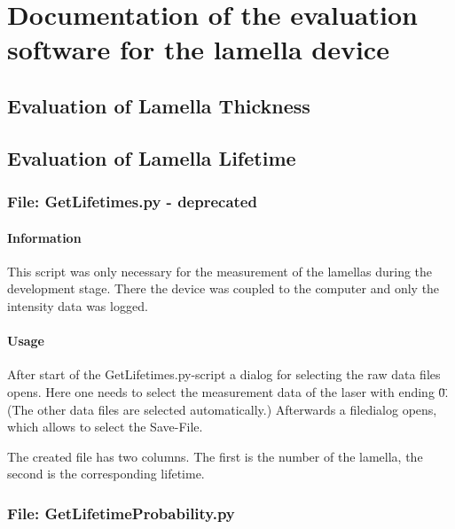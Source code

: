 \chapter{Documentation of the evaluation software for the lamella device}

\section{Evaluation of Lamella Thickness}



\section{Evaluation of Lamella Lifetime}


\subsection{File: GetLifetimes.py - deprecated}

\subsubsection{Information}
This script was only necessary for the measurement of the lamellas during the development stage. 
There the device was coupled to the computer and only the intensity data was logged. 

\subsubsection{Usage}

After start of the GetLifetimes.py-script a dialog for selecting the raw data files opens. Here one needs to select the measurement data of the laser with ending \"0\". (The other data files are selected automatically.) Afterwards a filedialog opens, which allows to select the Save-File. 

The created file has two columns. The first is the number of the lamella, the second is the corresponding lifetime. 

\subsection{File: GetLifetimeProbability.py}
